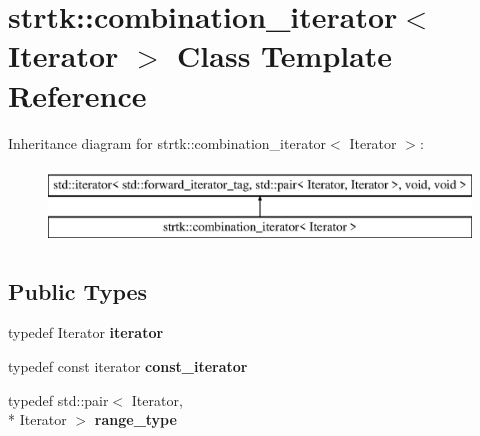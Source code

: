 \hypertarget{classstrtk_1_1combination__iterator}{\section{strtk\-:\-:combination\-\_\-iterator$<$ Iterator $>$ Class Template Reference}
\label{classstrtk_1_1combination__iterator}
}
Inheritance diagram for strtk\-:\-:combination\-\_\-iterator$<$ Iterator $>$\-:\begin{figure}[H]
\begin{center}
\leavevmode
\includegraphics[height=2.000000cm]{classstrtk_1_1combination__iterator}
\end{center}
\end{figure}
\subsection*{Public Types}
\begin{DoxyCompactItemize}
\item 
\hypertarget{classstrtk_1_1combination__iterator_a23555e9b85d322844788910a29d5df9d}{typedef Iterator {\bfseries iterator}}\label{classstrtk_1_1combination__iterator_a23555e9b85d322844788910a29d5df9d}

\item 
\hypertarget{classstrtk_1_1combination__iterator_a1e945ae333f2e40a729f5d70104cdb7e}{typedef const iterator {\bfseries const\-\_\-iterator}}\label{classstrtk_1_1combination__iterator_a1e945ae333f2e40a729f5d70104cdb7e}

\item 
\hypertarget{classstrtk_1_1combination__iterator_acad4b059bcc059577cc09e001555c176}{typedef std\-::pair$<$ Iterator, \\*
Iterator $>$ {\bfseries range\-\_\-type}}\label{classstrtk_1_1combination__iterator_acad4b059bcc059577cc09e001555c176}

\end{DoxyCompactItemize}
